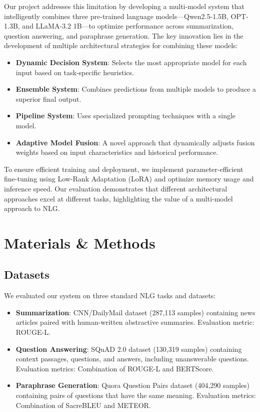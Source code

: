 \documentclass[10pt,twocolumn,letterpaper]{article}
\begin{document}
Our project addresses this limitation by developing a multi-model system that intelligently combines three pre-trained language models—Qwen2.5-1.5B, OPT-1.3B, and LLaMA-3.2 1B—to optimize performance across summarization, question answering, and paraphrase generation. The key innovation lies in the development of multiple architectural strategies for combining these models:
\begin{itemize}
    \item \textbf{Dynamic Decision System}: Selects the most appropriate model for each input based on task-specific heuristics.
    \item \textbf{Ensemble System}: Combines predictions from multiple models to produce a superior final output.
    \item \textbf{Pipeline System}: Uses specialized prompting techniques with a single model.
    \item \textbf{Adaptive Model Fusion}: A novel approach that dynamically adjusts fusion weights based on input characteristics and historical performance.
\end{itemize}
To ensure efficient training and deployment, we implement parameter-efficient fine-tuning using Low-Rank Adaptation (LoRA) and optimize memory usage and inference speed. Our evaluation demonstrates that different architectural approaches excel at different tasks, highlighting the value of a multi-model approach to NLG.

\section{Materials \& Methods}

\subsection{Datasets}
We evaluated our system on three standard NLG tasks and datasets:
\begin{itemize}
    \item \textbf{Summarization}: CNN/DailyMail dataset (287,113 samples) containing news articles paired with human-written abstractive summaries. Evaluation metric: ROUGE-L.
    \item \textbf{Question Answering}: SQuAD 2.0 dataset (130,319 samples) containing context passages, questions, and answers, including unanswerable questions. Evaluation metrics: Combination of ROUGE-L and BERTScore.
    \item \textbf{Paraphrase Generation}: Quora Question Pairs dataset (404,290 samples) containing pairs of questions that have the same meaning. Evaluation metrics: Combination of SacreBLEU and METEOR.
\end{itemize}
\end{document}
